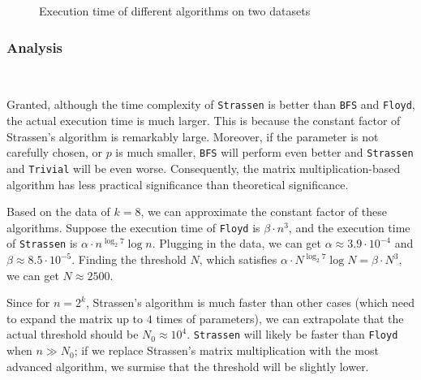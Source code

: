 \documentclass[11pt]{article}
\theoremstyle{plain}
\begin{document}
\begin{figure}[ht]
    \centering
    \caption{Execution time of different algorithms on two datasets}
    \label{fig:et}
\end{figure}

\subsubsection{Analysis}\

Granted, although the time complexity of \texttt{Strassen} is better than \texttt{BFS} and \texttt{Floyd}, the actual execution time is much larger. This is because the constant factor of Strassen's algorithm is remarkably large. Moreover, if the parameter is not carefully chosen, or $p$ is much smaller, \texttt{BFS} will perform even better and \texttt{Strassen} and \texttt{Trivial} will be even worse. Consequently, the matrix multiplication-based algorithm has less practical significance than theoretical significance.

Based on the data of $k=8$, we can approximate the constant factor of these algorithms. Suppose the execution time of \texttt{Floyd} is $\beta\cdot n^3$, and the execution time of \texttt{Strassen} is $\alpha\cdot n^{\log_2 7}\log n$. Plugging in the data, we can get $\alpha\approx 3.9\cdot 10^{-4}$ and $\beta\approx 8.5\cdot 10^{-5}$. Finding the threshold $N$, which satisfies $\alpha\cdot N^{\log_2 7}\log N=\beta\cdot N^3$, we can get $N\approx 2500$. 

Since for $n=2^k$, Strassen's algorithm is much faster than other cases (which need to expand the matrix up to $4$ times of parameters), we can extrapolate that the actual threshold should be $N_0\approx 10^4$. \texttt{Strassen} will likely be faster than \texttt{Floyd} when $n\gg N_0$; if we replace Strassen's matrix multiplication with the most advanced algorithm, we surmise that the threshold will be slightly lower.
\end{document}
